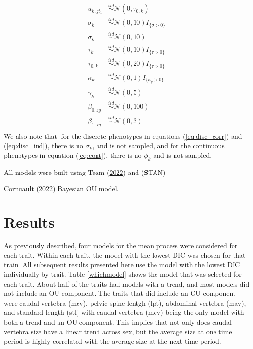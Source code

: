 \documentclass[
  12pt,
]{article}
\begin{document}
\begin{align}
u_{k,gt_1} & \overset{iid}{\sim}\mathcal{N}(0,\tau_{0,k}) \nonumber \\
\sigma_k & \overset{iid}{\sim}\mathcal{N}(0,10)I_{\{\sigma > 0\}} \nonumber \\
\sigma_k & \overset{iid}{\sim}\mathcal{N}(0,10) \nonumber \\
\tau_k & \overset{iid}{\sim}\mathcal{N}(0,10)I_{\{\tau > 0\}} \nonumber \\
\tau_{0,k} & \overset{iid}{\sim}\mathcal{N}(0,20)I_{\{\tau > 0\}} \nonumber \\
\kappa_k & \overset{iid}{\sim}\mathcal{N}(0,1)I_{\{\kappa_g > 0\}} \nonumber \\
\gamma_{k} & \overset{iid}{\sim}\mathcal{N}(0,5) \nonumber \\
\beta_{0,kg} & \overset{iid}{\sim}\mathcal{N}(0,100) \nonumber \\
\beta_{1,kg} & \overset{iid}{\sim}\mathcal{N}(0,3) \nonumber \\
\label{eq:priors}
\end{align} We also note that, for the discrete phenotypes in equations
(\ref{eq:disc_corr}) and (\ref{eq:disc_ind}), there is no \(\sigma_k\),
and is not sampled, and for the continuous phenotypes in equation
(\ref{eq:cont}), there is no \(\phi_k\) and is not sampled.

All models were built using Team
(\protect\hyperlink{ref-R2022language}{2022}) and (\textbf STAN)

Cornuault (\protect\hyperlink{ref-Cornault2022}{2022}) Bayesian OU
model.

\hypertarget{sec:results}{%
\section{Results}\label{sec:results}}

As previously described, four models for the mean process were
considered for each trait. Within each trait, the model with the lowest
DIC was chosen for that train. All subsequent results presented here use
the model with the lowest DIC individually by trait. Table
\ref{whichmodel} shows the model that was selected for each trait. About
half of the traits had models with a trend, and most models did not
include an OU component. The traits that did include an OU component
were caudal vertebra (mcv), pelvic spine lentgh (lpt), abdominal
vertebra (mav), and standard length (stl) with caudal vertebra (mcv)
being the only model with both a trend and an OU component. This implies
that not only does caudal vertebra size have a linear trend across sex,
but the average size at one time period is highly correlated with the
average size at the next time period.
\end{document}
